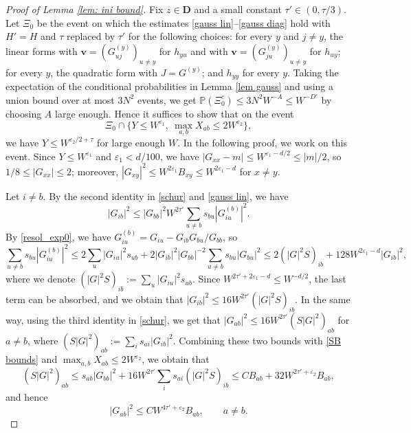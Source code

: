\documentclass{article}
\newcommand{\1}{\mathds{1}}
\numberwithin{equation}{section}
\newcommand{\be}{\begin{equation}}
\newcommand{\ee}{\end{equation}}
\newcommand{\e}{{\varepsilon}}
\renewcommand{\leq}{\leqslant}
\renewcommand{\le}{\leq}
\renewcommand{\P}{\mathbb{P}}
\theoremstyle{plain} %
\theoremstyle{remark}
\begin{document}
\begin{proof}[Proof of Lemma \ref{lem: ini bound}]
Fix $z\in \mathbf D$ and a small constant $\tau'\in (0,\tau/3)$. Let $\Xi_0$ be the event on which the estimates \eqref{gauss lin}--\eqref{gauss diag} hold with $H'=H$ and $\tau$ replaced by $\tau'$ for the following choices: for every $y$ and $j\ne y$, the linear forms with $\mathbf v=(G^{(y)}_{uj})_{u\ne y}$ for $h_{yu}$ and with $\mathbf v=(G^{(y)}_{ju})_{u\ne y}$ for $h_{uy}$; for every $y$, the quadratic form with $J=G^{(y)}$; and $h_{yy}$ for every $y$. Taking the expectation of the conditional probabilities in Lemma \ref{lem gauss} and using a union bound over at most $3N^2$ events, we get $\P(\Xi_0^c)\le 3N^2W^{-A}\le W^{-D'}$ by choosing $A$ large enough. Hence it suffices to show that on the event
$$\Xi_0\cap\Big\{Y\le W^{\e_1},\ \max_{a,b}X_{ab}\le 2W^{\e_2}\Big\},$$
we have $Y\le W^{\e_2/2+\tau}$ for large enough $W$. In the following proof, we work on this event. Since $Y\le W^{\e_1}$ and $\e_1<d/100$, we have $|G_{xx}-m|\le W^{\e_1-d/2}\le |m|/2$, so $1/8\le |G_{xx}|\le 2$; moreover, $|G_{xy}|^2\le W^{2\e_1}B_{xy}\le W^{2\e_1-d}$ for $x\ne y$.

\medskip
{} Let $i\ne b$. By the second identity in \eqref{schur} and \eqref{gauss lin}, we have
$$|G_{ib}|^2\le |G_{bb}|^2W^{2\tau'}\sum_{u\ne b}s_{bu}|G^{(b)}_{iu}|^2.$$
By \eqref{resol_exp0}, we have $G^{(b)}_{iu}=G_{iu}-G_{ib}G_{bu}/G_{bb}$, so
$$\sum_{u\ne b}s_{bu}|G^{(b)}_{iu}|^2\le 2\sum_u |G_{iu}|^2s_{ub}+2|G_{ib}|^2|G_{bb}|^{-2}\sum_{u\ne b}s_{bu}|G_{bu}|^2\le 2(|G|^2S)_{ib}+128W^{2\e_1-d}|G_{ib}|^2,$$
where we denote $(|G|^2S)_{ib}:=\sum_u|G_{iu}|^2s_{ub}$. Since $W^{2\tau'+2\e_1-d}\le W^{-d/2}$, the last term can be absorbed, and we obtain that $|G_{ib}|^2\le 16W^{2\tau'}(|G|^2S)_{ib}$. In the same way, using the third identity in \eqref{schur}, we get that $|G_{ab}|^2\le 16W^{2\tau'}(S|G|^2)_{ab}$ for $a\ne b$, where $(S|G|^2)_{ab}:=\sum_is_{ai}|G_{ib}|^2$. Combining these two bounds with \eqref{SB bounds} and $\max_{a,b}X_{ab}\le 2W^{\e_2}$, we obtain that
$$ (S|G|^2)_{ab}\le s_{ab}|G_{bb}|^2+16W^{2\tau'}\sum_{i}s_{ai}(|G|^2S)_{ib}\le CB_{ab}+32W^{2\tau'+\e_2}B_{ab},$$
and hence
\be\label{offdiag improve}
|G_{ab}|^2\le CW^{4\tau'+\e_2}B_{ab},\qquad a\ne b.
\ee


\end{proof}
\end{document}
